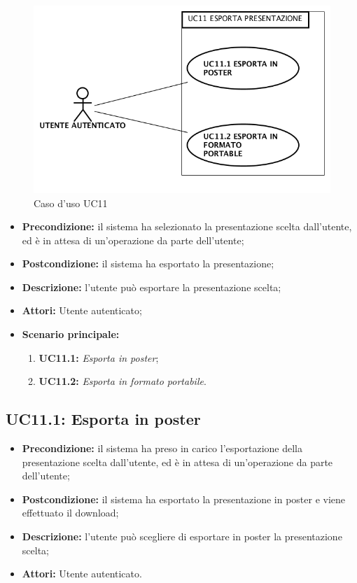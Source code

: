 \begin{figure}[H]
	\begin{center}
	\includegraphics[scale=0.4]{diagram/UC11.png}
	\caption{Caso d'uso UC11}
	\end{center}
\end{figure}
\begin{itemize}
	\item \textbf{Precondizione:} il sistema ha selezionato la presentazione scelta dall'utente, ed è in attesa di un'operazione da parte dell'utente;
	\item \textbf{Postcondizione:} il sistema ha esportato la presentazione;
	\item \textbf{Descrizione:} l'utente può esportare la presentazione scelta;
	\item \textbf{Attori:} Utente autenticato;
	\item \textbf{Scenario principale:}
	\begin{enumerate}
		\item \textbf{ UC11.1:} \textit{ Esporta in poster};
		\item \textbf{ UC11.2:} \textit{ Esporta in formato portabile}.
	\end{enumerate}
\end{itemize}
\subsection{ UC11.1: Esporta in poster}

\begin{itemize}
	\item \textbf{Precondizione:} il sistema ha preso in carico l'esportazione della presentazione scelta dall'utente, ed è in attesa di un'operazione da parte dell'utente;
	\item \textbf{Postcondizione:} il sistema ha esportato la presentazione in poster e viene effettuato il download;
	\item \textbf{Descrizione:} l'utente può scegliere di esportare in poster la presentazione scelta;
	\item \textbf{Attori:} Utente autenticato.
\end{itemize}
